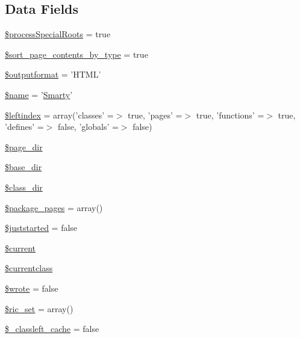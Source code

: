 \subsection*{\-Data \-Fields}
\begin{DoxyCompactItemize}
\item 
\hyperlink{class_h_t_m_l_smarty_converter_adcae2bdef17468fc5bf2f15981da497e}{\$process\-Special\-Roots} = true
\item 
\hyperlink{class_h_t_m_l_smarty_converter_ab5dae87e1968b35e37687a763216a835}{\$sort\-\_\-page\-\_\-contents\-\_\-by\-\_\-type} = true
\item 
\hyperlink{class_h_t_m_l_smarty_converter_af0bfe153c049d957e8ea29b147025108}{\$outputformat} = '\-H\-T\-M\-L'
\item 
\hyperlink{class_h_t_m_l_smarty_converter_ab2fc40d43824ea3e1ce5d86dee0d763b}{\$name} = '\hyperlink{class_smarty}{\-Smarty}'
\item 
\hyperlink{class_h_t_m_l_smarty_converter_ab49669c749559bb7833762878adb8f0c}{\$leftindex} = array('classes' =$>$ true, 'pages' =$>$ true, 'functions' =$>$ true, 'defines' =$>$ false, 'globals' =$>$ false)
\item 
\hyperlink{class_h_t_m_l_smarty_converter_ab554c658003c5e2653580ba881cd50eb}{\$page\-\_\-dir}
\item 
\hyperlink{class_h_t_m_l_smarty_converter_aa36f57c62963507498e1181f9a75bbb9}{\$base\-\_\-dir}
\item 
\hyperlink{class_h_t_m_l_smarty_converter_aaeaa82d379050faafbb4bf4b82733c94}{\$class\-\_\-dir}
\item 
\hyperlink{class_h_t_m_l_smarty_converter_acb916db0304b969918dbc0de762d45e0}{\$package\-\_\-pages} = array()
\item 
\hyperlink{class_h_t_m_l_smarty_converter_acb00e2d25525278b0592bfffe53bc4b6}{\$juststarted} = false
\item 
\hyperlink{class_h_t_m_l_smarty_converter_a2c4c58e377f6c66ca38c8ea97666fc5e}{\$current}
\item 
\hyperlink{class_h_t_m_l_smarty_converter_a14f3ccc5fc24cdb94ee022a77ef69c4d}{\$currentclass}
\item 
\hyperlink{class_h_t_m_l_smarty_converter_a2cf37faa5637b7639b816f3e61485a30}{\$wrote} = false
\item 
\hyperlink{class_h_t_m_l_smarty_converter_a84e3c5e32f1d02114c9d126d5864d06b}{\$ric\-\_\-set} = array()
\item 
\hyperlink{class_h_t_m_l_smarty_converter_ae2deccd53952185054a55b156ea5acaf}{\$\-\_\-classleft\-\_\-cache} = false

\end{DoxyCompactItemize}
